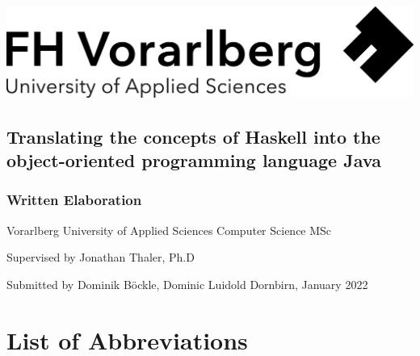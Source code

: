 \documentclass[a4paper,12pt,twoside]{scrreprt}
\begin{document}
\onehalfspacing %

{}
\cleardoublepage %
\thispagestyle{empty}
\begin{titlepage}
    \begin{flushright}
    \includegraphics[width=0.4\linewidth]{Logo-A3.jpg}
    \end{flushright}
    \begin{flushleft}
    \vspace{0.5cm}
    \section*{Translating the concepts of Haskell into the object-oriented programming language Java}
    \subsection*{Written Elaboration}

    \vspace{4cm}
    Vorarlberg University of Applied Sciences\newline
    Computer Science MSc

    \vspace{0.5cm}

    Supervised by\newline
    Jonathan Thaler, Ph.D

    \vspace{0.5cm}

    Submitted by\newline
    Dominik Böckle,\newline
    Dominic Luidold\newline\newline
    Dornbirn, January 2022
    \end{flushleft}
\end{titlepage}

\cleardoublepage %
\setcounter{tocdepth}{2}
\tableofcontents

\clearpage
{}
{}
\chapter*{List of Abbreviations}
\begin{acronym}
\end{acronym}
\end{document}
